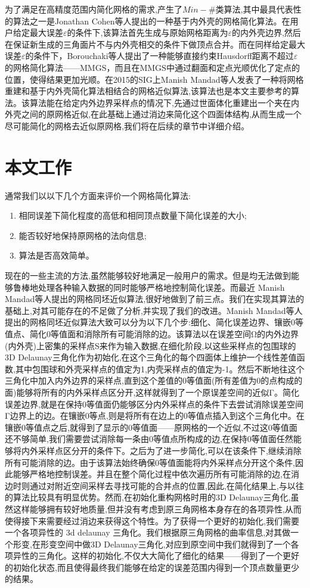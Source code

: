 为了满足在高精度范围内简化网格的需求,产生了$Min−\#$类算法,其中最具代表性的算法之一是Jonathan Cohen等人提出的一种基于内外壳的网格简化算法\cite{?}。在用户给定最大误差$\varepsilon$的条件下,该算法首先生成与原始网格距离为$\varepsilon$的内外壳边界,然后在保证新生成的三角面片不与内外壳相交的条件下做顶点合并。而在同样给定最大误差$\varepsilon$的条件下，Borouchaki等人提出了一种能够直接约束Hausdorff距离不超过$\varepsilon$的网格简化算法——MMGS，而且在MMGS中通过翻面和定点光顺优化了定点的位置，使得结果更加光顺。在2015的SIG上Manish Mandad等人发表了一种将网格重建和基于内外壳简化算法相结合的网格近似算法,该算法也是本文主要参考的算法。该算法能在给定内外边界采样点的情况下,先通过世面体化重建出一个夹在内外壳之间的原网格近似,在此基础上通过消边来简化这个四面体结构,从而生成一个尽可能简化的网格去近似原网格,我们将在后续的章节中详细介绍。
\section{本文工作}
通常我们以以下几个方面来评价一个网格简化算法:
\begin{enumerate}
\item 相同误差下简化程度的高低和相同顶点数量下简化误差的大小;
\item 能否较好地保持原网格的法向信息;
\item 算法是否高效简单。
\end{enumerate}
现在的一些主流的方法,虽然能够较好地满足一般用户的需求。但是均无法做到能够鲁棒地处理各种输入数据的同时能够严格地控制简化误差。而最近 Manish Mandad等人提出的网格同坯近似算法,很好地做到了前三点。我们在实现其算法的基础上,对其可能存在的不足做了分析,并实现了我们的改进。Manish Mandad等人提出的网格同坯近似算法大致可以分为以下几个步:细化、简化误差边界、镶嵌0等值点、简化0等值面和消除所有可能消除的边。该算法以在误差空间Ω的内外边界(内外壳)上密集的采样点S来作为输入数据,在细化阶段,以这些采样点的包围球的3D Delaunay三角化作为初始化,在这个三角化的每个四面体上维护一个线性差值函数,其中包围球和外壳采样点的值定为1,内壳采样点的值定为-1。然后不断地往这个三角化中加入内外边界的采样点,直到这个差值的0等值面(所有差值为0的点构成的面)能够将所有的内外采样点区分开,这样就得到了一个原误差空间的近似Γ。简化误差边界,就是在保持0等值面仍能够区分内外采样点的条件下去尝试消除误差空间Γ边界上的边。在镶嵌0等点,则是将所有在边上的0等值点插入到这个三角化中。在镶嵌0等值点之后,就得到了显示的0等值面——原网格的一个近似,不过这0等值面还不够简单,我们需要尝试消除每一条由0等值点所构成的边,在保持0等值面任然能够将内外采样点区分开的条件下。之后为了进一步简化,可以在该条件下,继续消除所有可能消除的边。由于该算法始终确保0等值面能将内外采样点分开这个条件,因此能够严格地控制误差。并且在整个简化过程中依次遍历所有可能消除的边,在消边时则通过对附近空间采样去寻找可能的合并点的位置,因此,在简化结果上,与以往的算法比较具有明显优势。然而,在初始化重构网格时用的3D Delaunay三角化,虽然这样能够拥有较好地质量,但并没有考虑到原三角网格本身存在的各项异性,从而使得接下来需要经过消边来获得这个特性。为了获得一个更好的初始化,我们需要一个各项异性的 3d delaunay 三角化。我们根据原三角网格的曲率信息,对其做一个形变,在形变空间中做3D Delaunay三角化,对应到原空间中我们就得到了一个各项异性的三角化。这样的初始化,不仅大大简化了细化的结果——得到了一个更好的初始化状态,而且使得最终我们能够在给定的误差范围内得到一个顶点数量更少的结果。

